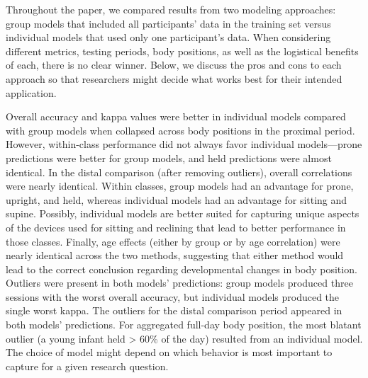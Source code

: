 \documentclass[
  man]{apa6}
\begin{document}
Throughout the paper, we compared results from two modeling approaches: group models that included all participants' data in the training set versus individual models that used only one participant's data. When considering different metrics, testing periods, body positions, as well as the logistical benefits of each, there is no clear winner. Below, we discuss the pros and cons to each approach so that researchers might decide what works best for their intended application.

Overall accuracy and kappa values were better in individual models compared with group models when collapsed across body positions in the proximal period. However, within-class performance did not always favor individual models---prone predictions were better for group models, and held predictions were almost identical. In the distal comparison (after removing outliers), overall correlations were nearly identical. Within classes, group models had an advantage for prone, upright, and held, whereas individual models had an advantage for sitting and supine. Possibly, individual models are better suited for capturing unique aspects of the devices used for sitting and reclining that lead to better performance in those classes. Finally, age effects (either by group or by age correlation) were nearly identical across the two methods, suggesting that either method would lead to the correct conclusion regarding developmental changes in body position. Outliers were present in both models' predictions: group models produced three sessions with the worst overall accuracy, but individual models produced the single worst kappa. The outliers for the distal comparison period appeared in both models' predictions. For aggregated full-day body position, the most blatant outlier (a young infant held \textgreater{} 60\% of the day) resulted from an individual model. The choice of model might depend on which behavior is most important to capture for a given research question.
\end{document}
